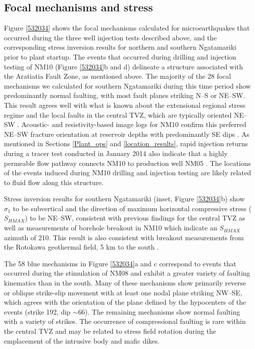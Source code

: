 \subsection{Focal mechanisms and stress}
Figure \ref{532034} shows the focal mechanisms calculated for microearthquakes that occurred during the three well injection tests described above, and the corresponding stress inversion results for northern and southern Ngatamariki prior to plant startup. The events that occurred during drilling and injection testing of NM10 (Figure \ref{532034}b and d) delineate a structure associated with the Aratiatia Fault Zone, as mentioned above. The majority of the 28 focal mechanisms we calculated for southern Ngatamariki during this time period show predominantly normal faulting, with most fault planes striking N--S or NE--SW. This result agrees well with what is known about the extensional regional stress regime and the local faults in the central TVZ, which are typically oriented NE--SW \citep{Massiot_2015}. Acoustic- and resistivity-based image logs for NM10 confirm this preferred NE--SW fracture orientation at reservoir depths with predominantly SE dips \citep{nm10_report}. As mentioned in Sections \ref{Plant_ops} and \ref{location_results}, rapid injection returns during a tracer test conducted in January 2014 also indicate that a highly permeable flow pathway connects NM10 to production well NM05 \citep{buscarlet_2015}. The locations of the events induced during NM10 drilling and injection testing are likely related to fluid flow along this structure.

Stress inversion results for southern Ngatamariki (inset, Figure \ref{532034}b) show $\sigma_1$ to be subvertical and the direction of maximum horizontal compressive stress ($S_{HMAX}$) to be NE--SW, consistent with previous findings for the central TVZ \citep{Townend_2012} as well as measurements of borehole breakout in NM10 which indicate an $S_{HMAX}$ azimuth of 210\textdegree \citep{nm10_report}. This result is also consistent with breakout measurements from the Rotokawa geothermal field, 5 km to the south \citep{McNamara_2015}.

The 58 blue mechanisms in Figure \ref{532034}a and c correspond to events that occurred during the stimulation of NM08 and exhibit a greater variety of faulting kinematics than in the south. Many of these mechanisms show primarily reverse or oblique strike-slip movement with at least one nodal plane striking NW--SE, which agrees with the orientation of the plane defined by the hypocenters of the events (strike 192\textdegree, dip $\sim$66\textdegree). The remaining mechanisms show normal faulting with a variety of strikes. The occurrence of compressional faulting is rare within the central TVZ and may be related to stress field rotation during the emplacement of the intrusive body and mafic dikes.

